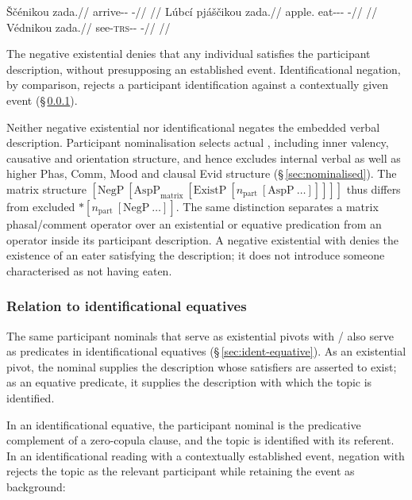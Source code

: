 \pex
\a
\begingl
\gla Ščénikou zada.//
\glb arrive-\Pf{}-\Nmlz{} \NegExst{}-\Cont{}//
\glft {} //
\endgl
\a
\begingl
\gla Lúbcí pjáščikou zada.//
\glb apple.\Ind{} eat-\Antip{}-\Pf{}-\Nmlz{} \NegExst{}-\Cont{}//
\glft {} //
\endgl
\a
\begingl
\gla Védnikou zada.//
\glb see-\textsc{trs}-\Pf{}-\Nmlz{} \NegExst{}-\Cont{}//
\glft {} //
\endgl
\xe

The negative existential denies that any individual satisfies the participant
description, without presupposing an established event. Identificational
negation, by comparison, rejects a participant identification against a
contextually given event (§\,\ref{sec:exst-vs-ident}).

Neither negative existential  nor identificational 
negates the embedded verbal description. Participant nominalisation selects
actual , including inner valency, causative and orientation
structure, and hence excludes internal verbal  as well as higher
Phas, Comm, Mood and clausal Evid structure (§\,\ref{sec:nominalised}).
The matrix structure $[\mathrm{NegP}\ [\mathrm{AspP}_{\mathrm{matrix}}\ [\mathrm{ExistP}\
[n_{\mathrm{part}}\ [\mathrm{AspP}\ \ldots]]]]]$ thus differs from excluded
$*[n_{\mathrm{part}}\ [\mathrm{NegP}\ \ldots]]$. The same distinction
separates a matrix phasal/comment operator over an existential or equative
predication from an operator inside its participant description. A negative
existential with
 denies the existence of an eater satisfying the description;
it does not introduce someone characterised as not having eaten.

\subsubsection{Relation to identificational equatives}
\label{sec:exst-vs-ident}

The same participant nominals that serve as existential pivots with
\ird{jec-}/\ird{zad-} also serve as predicates in identificational equatives
(§\,\ref{sec:ident-equative}). As an existential pivot, the nominal supplies the description whose
satisfiers are asserted to exist; as an equative predicate, it supplies the
description with which the topic is identified.

In an identificational equative, the participant nominal is the predicative
complement of a zero-copula clause, and the topic is identified with its referent.
In an identificational reading with a contextually established event,
negation with \ird{staly} rejects the topic as the relevant participant
while retaining the event as background:

